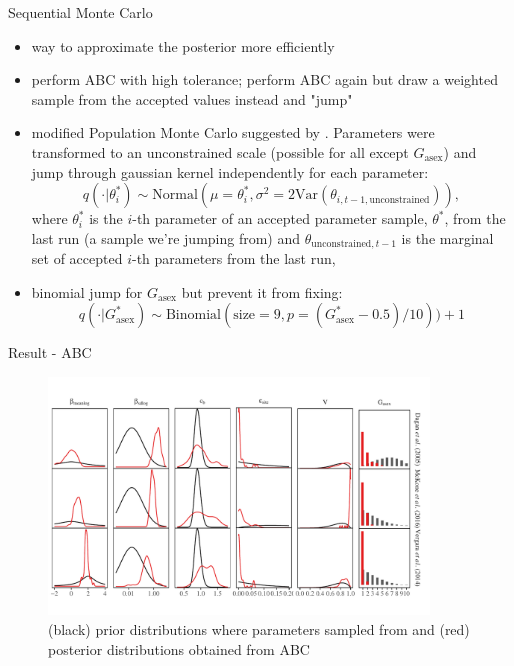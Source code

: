 \documentclass{beamer}
\begin{document}
\begin{frame}{Sequential Monte Carlo}
\begin{itemize}
    \item way to approximate the posterior more efficiently
    \item perform ABC with high tolerance; perform ABC again but draw a weighted sample from the accepted values instead and "jump"
    \item modified Population Monte Carlo suggested by \cite{turner2012tutorial}. Parameters were transformed to an unconstrained scale (possible for all except $G_{\textrm{asex}}$) and jump through gaussian kernel independently for each parameter:
    $$
    q(\cdot | \theta_i^\ast) \sim \mathrm{Normal}(\mu = \theta_i^\ast, \sigma^2 = 2\mathrm{Var}(\theta_{i, t-1, \textrm{unconstrained}})),
    $$
    where $\theta_i^\ast$ is the $i$-th parameter of an accepted parameter sample, $\theta^\ast$, from the last run (a sample we're jumping from) and $\theta_{\textrm{unconstrained}, t-1}$ is the marginal set of accepted $i$-th parameters from the last run,
    \item binomial jump for $G_{\textrm{asex}}$ but prevent it from fixing:
    $$
    q(\cdot | G_{\textrm{asex}}^\ast) \sim \mathrm{Binomial}(\textrm{size}=9, p=(G_{\textrm{asex}}^\ast-0.5)/10)) + 1
    $$
\end{itemize}
\end{frame}

\begin{frame}{Result - ABC}
\begin{figure}
\vspace{-1em}
\includegraphics[width=0.9\textwidth]{../fig/smc_param.pdf}
\caption{(black) prior distributions where parameters sampled from and (red) posterior distributions obtained from ABC}
\vspace{-1em}
\end{figure}
\end{frame}
\end{document}
